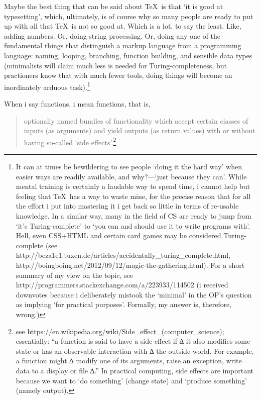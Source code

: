 Maybe the best thing that can be said about \TeX\ is that `it is good at typesetting', which, ultimately, is
of course why so many people are ready to put up with all that \TeX\ is not so good at. Which is a lot, to
say the least. Like, adding numbers. Or, doing string processing. Or, doing any one of the fundamental things that
distinguish a markup language from a programming language: naming, looping, branching, function building,
and sensible data types (minimalists will claim much less is needed for Turing-completeness, but practioners
know that with much fewer tools, doing things will become an inordinately arduous task).\footnote{It can at
times be bewildering to see people `doing it the hard way' when easier ways are readily available, and
why?---`just because they can'. While mental training is certainly a laudable way to spend time, i cannot
help but feeling that \TeX\ has a way to waste mine, for the precise reason that for all the effort i put
into mastering it i get back so little in terms of re-usable knowledge. In a similar way, many in the field
of CS are ready to jump from `it's Turing-complete' to `you can and should use it to write programs with'.
Hell, even CSS$+$HTML and certain card games may be considered Turing-complete (see
http://beza1e1.tuxen.de/articles/accidentally\_turing\_complete.html,
http://boingboing.net/2012/09/12/magic-the-gathering.html). For a short summary of my view on the topic, see
http://programmers.stackexchange.com/a/223933/114502 (i received downvotes because i deliberately mistook
the `minimal' in the OP's question as implying `for practical purposes'. Formally, my answer is, therefore,
wrong.)}

When i say functions, i mean functions, that is,

\begin{quote}
optionally named bundles of functionality which accept
certain classes of inputs (as arguments) and yield outputs (as return values) with or without having
so-called `side effects'.\footnote{see https://en.wikipedia.org/wiki/Side\_effect\_(computer\_science);
essentially: ``a function is said to have a side effect if ∆ it also modifies some state or has an
observable interaction with ∆ the outside world. For example, a function might ∆ modify one of its
arguments, raise an exception, write data to a display or file ∆.'' In practical computing, side effects are
important because we want to `do something' (change state) and `produce something' (namely output).}
\end{quote}

